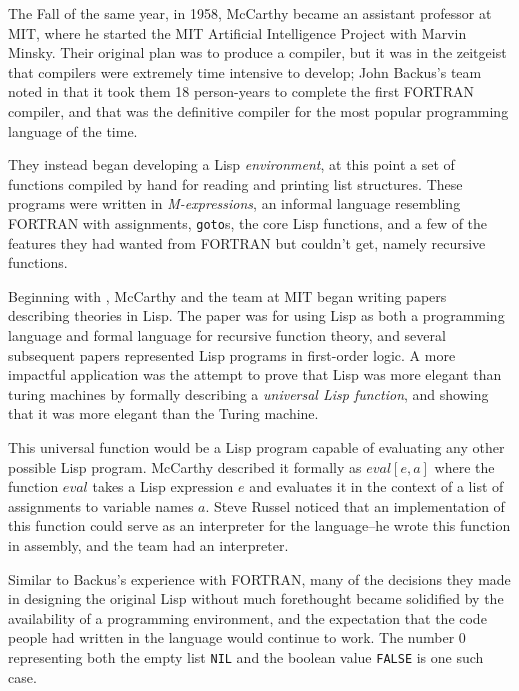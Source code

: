 The Fall of the same year, in 1958,
McCarthy became an assistant professor at MIT, where he started
the MIT Artificial Intelligence Project with Marvin Minsky.
Their original plan was to produce a compiler, but it
was in the zeitgeist that compilers were extremely time intensive
to develop; John Backus's team noted in 
that it took them 18 person-years to complete the first FORTRAN compiler,
and that was the definitive compiler for the most popular
programming language of the time.

They instead began developing a Lisp \textit{environment}, at this point a set of
functions compiled by hand for reading and printing list structures.
These programs were written in \textit{M-expressions}, an informal language resembling
FORTRAN with assignments, \texttt{goto}s, the core Lisp functions, and a few
of the features they had wanted from FORTRAN but couldn't get, namely recursive functions.

Beginning with , McCarthy and the
team at MIT began writing papers describing theories in Lisp.
The \citeyear{mccarthy_recursive_functions_computation_1960} paper was for using Lisp
as both a programming language and formal language for recursive function theory,
and several subsequent papers represented Lisp programs in first-order logic.
A more impactful application was the attempt to prove that Lisp was more elegant than
turing machines by formally describing a \textit{universal Lisp function},
and showing that it was more elegant than the Turing machine.

This universal function would be a Lisp program capable of evaluating
any other possible Lisp program. McCarthy described it formally as $eval[e, a]$
where the function $eval$ takes a Lisp expression $e$ and evaluates it in the context
of a list of assignments to variable names $a$.
Steve Russel noticed that an implementation of this function could
serve as an interpreter for the language--he wrote this function
in assembly, and the team had an interpreter.

Similar to Backus's experience with FORTRAN, many of the decisions they made
in designing the original Lisp without much forethought became solidified
by the availability of a programming environment, and the expectation that
the code people had written in the language would continue to work.
The number 0 representing both the empty list \texttt{NIL} and the boolean value
\texttt{FALSE} is one such case.

